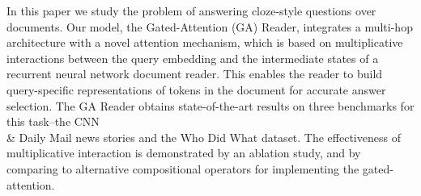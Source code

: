 In this paper we study the problem of answering cloze-style questions over documents. Our model, the Gated-Attention (GA) Reader, integrates a multi-hop architecture with a novel attention mechanism, which is based on multiplicative interactions between the query embedding and the intermediate states of a recurrent neural network document reader. This enables the reader to build query-specific representations of tokens in the document for accurate answer selection. The GA Reader obtains state-of-the-art results on three benchmarks for this task--the CNN \\& Daily Mail news stories and the Who Did What dataset. The effectiveness of multiplicative interaction is demonstrated by an ablation study, and by comparing to alternative compositional operators for implementing the gated-attention.
